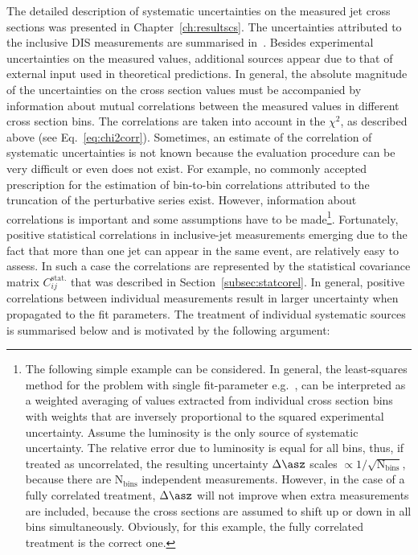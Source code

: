 The detailed description of systematic uncertainties on the measured jet cross sections was presented in Chapter~\ref{ch:resultscs}. The uncertainties attributed to the inclusive DIS measurements are summarised in~\cite{Aaron:2009aa}. Besides experimental uncertainties on the measured values, additional sources appear due to that of external input used in theoretical predictions. In general, the absolute magnitude of the uncertainties on the cross section values must be accompanied by information about mutual correlations between the measured values in different cross section bins. The correlations are taken into account in the $\chi^2$, as described above (see Eq.~\ref{eq:chi2corr}). Sometimes, an estimate of the correlation of systematic uncertainties is not known because the evaluation procedure can be very difficult or even does not exist. For example, no commonly accepted prescription for the estimation of bin-to-bin correlations attributed to the truncation of the perturbative series exist. However, information about correlations is important and some assumptions have to be made\footnote{The following simple example can be considered. In general, the least-squares method for the problem with single fit-parameter e.g.~\asz, can be interpreted as a weighted averaging of \asz values extracted from individual cross section bins with weights that are inversely proportional to the squared experimental uncertainty. Assume the luminosity is the only source of systematic uncertainty. The relative error due to luminosity is equal for all bins, thus, if treated as uncorrelated, the resulting uncertainty $\Delta\asz$ scales $\propto 1/\sqrt{\text{N}_\text{bins}}$, because there are $\text{N}_\text{bins}$ independent \asz measurements. However, in the case of a fully correlated treatment, $\Delta\asz$ will not improve when extra measurements are included, because the cross sections are assumed to shift up or down in all bins simultaneously. Obviously, for this example, the fully correlated treatment is the correct one.}. Fortunately, positive statistical correlations in inclusive-jet measurements emerging due to the fact that more than one jet can appear in the same event, are relatively easy to assess. In such a case the correlations are represented by the statistical covariance matrix $C_{ij}^{\text{stat.}}$ that was described in Section~\ref{subsec:statcorel}. In general, positive correlations between individual measurements result in larger uncertainty when propagated to the fit parameters. The treatment of individual systematic sources is summarised below and is motivated by the following argument: 

